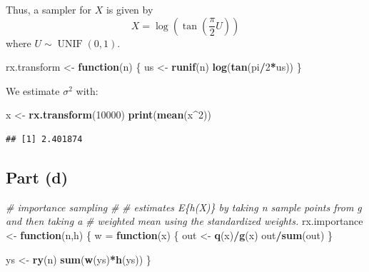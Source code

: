 \documentclass[
  11pt,
]{article}
\newenvironment{Shaded}{\begin{snugshade}}{\end{snugshade}}
\newcommand{\CommentTok}[1]{\textcolor[rgb]{0.56,0.35,0.01}{\textit{#1}}}
\newcommand{\ControlFlowTok}[1]{\textcolor[rgb]{0.13,0.29,0.53}{\textbf{#1}}}
\newcommand{\DecValTok}[1]{\textcolor[rgb]{0.00,0.00,0.81}{#1}}
\newcommand{\FunctionTok}[1]{\textcolor[rgb]{0.13,0.29,0.53}{\textbf{#1}}}
\newcommand{\NormalTok}[1]{#1}
\newcommand{\OtherTok}[1]{\textcolor[rgb]{0.56,0.35,0.01}{#1}}
\newcommand{\SpecialCharTok}[1]{\textcolor[rgb]{0.81,0.36,0.00}{\textbf{#1}}}
\begin{document}
Thus, a sampler for \(X\) is given by \[
  X = \log\left(\tan\left(\frac{\pi}{2} U\right)\right)
\] where \(U \sim \operatorname{UNIF}(0,1)\).

\begin{Shaded}
\begin{Highlighting}[]
\NormalTok{rx.transform }\OtherTok{\textless{}{-}} \ControlFlowTok{function}\NormalTok{(n)}
\NormalTok{\{}
\NormalTok{  us }\OtherTok{\textless{}{-}} \FunctionTok{runif}\NormalTok{(n)}
  \FunctionTok{log}\NormalTok{(}\FunctionTok{tan}\NormalTok{(pi}\SpecialCharTok{/}\DecValTok{2}\SpecialCharTok{*}\NormalTok{us))}
\NormalTok{\}}
\end{Highlighting}
\end{Shaded}

We estimate \(\sigma^2\) with:

\begin{Shaded}
\begin{Highlighting}[]
\NormalTok{x }\OtherTok{\textless{}{-}} \FunctionTok{rx.transform}\NormalTok{(}\DecValTok{10000}\NormalTok{)}
\FunctionTok{print}\NormalTok{(}\FunctionTok{mean}\NormalTok{(x}\SpecialCharTok{\^{}}\DecValTok{2}\NormalTok{))}
\end{Highlighting}
\end{Shaded}

\begin{verbatim}
## [1] 2.401874
\end{verbatim}

\hypertarget{part-d}{%
\subsection{Part (d)}\label{part-d}}


\begin{Shaded}
\begin{Highlighting}[]
\CommentTok{\#\textquotesingle{} importance sampling}
\CommentTok{\#\textquotesingle{}}
\CommentTok{\#\textquotesingle{} estimates E\{h(X)\} by taking n sample points from g and then taking a}
\CommentTok{\#\textquotesingle{} weighted mean using the standardized weights.}
\NormalTok{rx.importance }\OtherTok{\textless{}{-}} \ControlFlowTok{function}\NormalTok{(n,h)}
\NormalTok{\{}
\NormalTok{  w }\OtherTok{=} \ControlFlowTok{function}\NormalTok{(x) \{}
\NormalTok{     out }\OtherTok{\textless{}{-}} \FunctionTok{q}\NormalTok{(x)}\SpecialCharTok{/}\FunctionTok{g}\NormalTok{(x)}
\NormalTok{     out}\SpecialCharTok{/}\FunctionTok{sum}\NormalTok{(out)}
\NormalTok{  \}}

\NormalTok{  ys }\OtherTok{\textless{}{-}} \FunctionTok{ry}\NormalTok{(n)}
  \FunctionTok{sum}\NormalTok{(}\FunctionTok{w}\NormalTok{(ys)}\SpecialCharTok{*}\FunctionTok{h}\NormalTok{(ys))}
\NormalTok{\}}
\end{Highlighting}
\end{Shaded}
\end{document}
